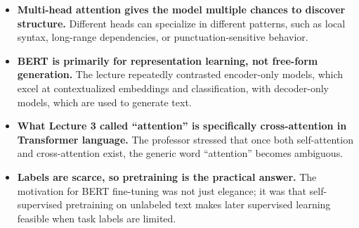\documentclass[11pt]{article}
\begin{document}
\begin{itemize}
    \item \textbf{Multi-head attention gives the model multiple chances to discover structure.} Different heads can specialize in different patterns, such as local syntax, long-range dependencies, or punctuation-sensitive behavior.
    \item \textbf{BERT is primarily for representation learning, not free-form generation.} The lecture repeatedly contrasted encoder-only models, which excel at contextualized embeddings and classification, with decoder-only models, which are used to generate text.
    \item \textbf{What Lecture 3 called ``attention'' is specifically cross-attention in Transformer language.} The professor stressed that once both self-attention and cross-attention exist, the generic word ``attention'' becomes ambiguous.
    \item \textbf{Labels are scarce, so pretraining is the practical answer.} The motivation for BERT fine-tuning was not just elegance; it was that self-supervised pretraining on unlabeled text makes later supervised learning feasible when task labels are limited.
\end{itemize}
\end{document}
